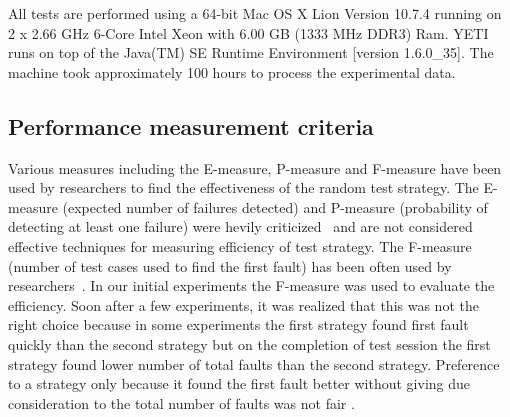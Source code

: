\documentclass[conference]{IEEEtran}
\begin{document}
%
%
%

All tests are performed using a 64-bit Mac OS X Lion Version 10.7.4 running on 2 x 2.66 GHz 6-Core Intel Xeon with 6.00 GB (1333 MHz DDR3) Ram. YETI runs on top of the Java(TM) SE Runtime Environment [version 1.6.0\_35]. The machine took approximately 100 hours to process the experimental data.



\subsection{Performance measurement criteria}
Various measures including the E-measure, P-measure and F-measure have been used by researchers to find the effectiveness of the random test strategy. The E-measure (expected number of failures detected) and P-measure (probability of detecting at least one failure) were hevily criticized~\cite{Chen2008} and are not considered effective techniques for measuring efficiency of test strategy. The F-measure (number of test cases used to find the first fault) has been often used by researchers~\cite{Chen1996,Chen2004}. In our initial experiments the F-measure was used to evaluate the efficiency. Soon after a few experiments, it was realized that this was not the right choice because in some experiments the first strategy found first fault quickly than the second strategy but on the completion of test session the first strategy found lower number of total faults than the second strategy. Preference to a strategy only because it found the first fault better without giving due consideration to the total number of faults was not fair \cite{Liu2012}.
\end{document}
